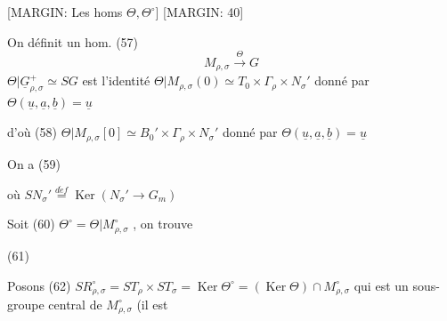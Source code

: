 \begin{enumerate}
\newpage


[MARGIN: Les homs $\Theta, \Theta^\circ$]
[MARGIN: 40]

On définit un hom.
(57) $$M_{\rho,\sigma} \overset{\Theta}{\longrightarrow} G$$
$\Theta | \underline{G}_{\rho,\sigma}^+ \simeq SG$ est l'identité
$\Theta | M_{\rho,\sigma}(0) \simeq T_0 \times \Gamma_\rho \times N_\sigma'$ donné par $\Theta(\underline{u}, \underline{a}, \underline{b}) = \underline{u}$

d'où
(58) $\Theta | M_{\rho,\sigma}[0] \simeq B_0' \times \Gamma_\rho \times N_\sigma'$ donné par $\Theta(\underline{u}, \underline{a}, \underline{b}) = \underline{u}$

On a
(59)
où $SN_\sigma' \overset{d\acute{e}f}{=} \operatorname{Ker}(N_\sigma' \to G_m)$

Soit
(60) $\Theta^\circ = \Theta | M_{\rho,\sigma}^\circ$ , on trouve

(61)

Posons
(62) $SR_{\rho,\sigma}^\circ = S T_\rho \times S T_\sigma = \operatorname{Ker} \Theta^\circ = (\operatorname{Ker} \Theta) \cap M_{\rho,\sigma}^\circ$
qui est un sous-groupe central de $M_{\rho,\sigma}^\circ$ (il est

\newpage


\end{enumerate}
